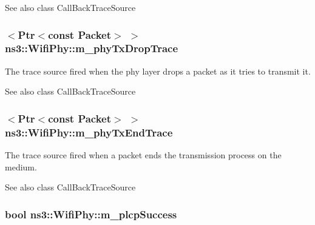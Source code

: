 \begin{DoxySeeAlso}{See also}
class Call\+Back\+Trace\+Source 
\end{DoxySeeAlso}
\subsubsection[{\texorpdfstring{m\+\_\+phy\+Tx\+Drop\+Trace}{m_phyTxDropTrace}}]{$<${\bf Ptr}$<$const {\bf Packet}$>$ $>$ ns3\+::\+Wifi\+Phy\+::m\+\_\+phy\+Tx\+Drop\+Trace\hspace{0.3cm}{\ttfamily [private]}}\hypertarget{classns3_1_1WifiPhy_a17b4a316c4fd6feac22b5abb38da689e}{}\label{classns3_1_1WifiPhy_a17b4a316c4fd6feac22b5abb38da689e}
The trace source fired when the phy layer drops a packet as it tries to transmit it.

\begin{DoxySeeAlso}{See also}
class Call\+Back\+Trace\+Source 
\end{DoxySeeAlso}
\subsubsection[{\texorpdfstring{m\+\_\+phy\+Tx\+End\+Trace}{m_phyTxEndTrace}}]{$<${\bf Ptr}$<$const {\bf Packet}$>$ $>$ ns3\+::\+Wifi\+Phy\+::m\+\_\+phy\+Tx\+End\+Trace\hspace{0.3cm}{\ttfamily [private]}}\hypertarget{classns3_1_1WifiPhy_a89be9fb17763c992ab79667c877db0bb}{}\label{classns3_1_1WifiPhy_a89be9fb17763c992ab79667c877db0bb}
The trace source fired when a packet ends the transmission process on the medium.

\begin{DoxySeeAlso}{See also}
class Call\+Back\+Trace\+Source 
\end{DoxySeeAlso}
\subsubsection[{\texorpdfstring{m\+\_\+plcp\+Success}{m_plcpSuccess}}]{\setlength{\rightskip}{0pt plus 5cm}bool ns3\+::\+Wifi\+Phy\+::m\+\_\+plcp\+Success\hspace{0.3cm}{\ttfamily [protected]}}\hypertarget{classns3_1_1WifiPhy_ad9a571bc52ef6cd8e63cff3dc14a718e}{}\label{classns3_1_1WifiPhy_ad9a571bc52ef6cd8e63cff3dc14a718e}


